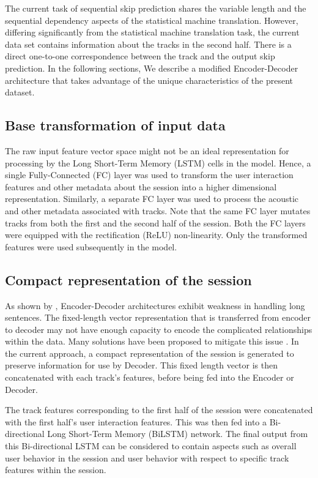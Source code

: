 \documentclass[sigconf]{acmart}
\begin{document}
The current task of sequential skip prediction shares the variable length and the sequential dependency aspects of the statistical machine translation. However, differing significantly from the statistical machine translation task, the current data set contains information about the tracks in the second half. There is a direct one-to-one correspondence between the track and the output skip prediction. In the following sections, We describe a modified Encoder-Decoder architecture that takes advantage of the unique characteristics of the present dataset.

\subsection{Base transformation of input data}
The raw input feature vector space might not be an ideal representation for processing by the Long Short-Term Memory (LSTM) cells in the model. Hence, a single Fully-Connected (FC) layer was used to transform the user interaction features and other metadata about the session into a higher dimensional representation. Similarly, a separate FC layer was used to process the acoustic and other metadata associated with tracks. Note that the same FC layer mutates tracks from both the first and the second half of the session. Both the FC layers were equipped with the rectification (ReLU) non-linearity. Only the transformed features were used subsequently in the model. 

\subsection{Compact representation of the session}
As shown by \citet{cho2014properties}, Encoder-Decoder architectures exhibit weakness in handling long sentences. The fixed-length vector representation that is transferred from encoder to decoder may not have enough capacity to encode the complicated relationships within the data. Many solutions have been proposed to mitigate this issue \cite{luong2015effective} \cite{vaswani2017attention}. In the current approach, a compact representation of the session is generated to preserve information for use by Decoder. This fixed length vector is then concatenated with each track's features, before being fed into the Encoder or Decoder.

The track features corresponding to the first half of the session were concatenated with the first half's user interaction features. This was then fed into a Bi-directional Long Short-Term Memory (BiLSTM) network. The final output from this Bi-directional LSTM can be considered to contain aspects such as overall user behavior in the session and user behavior with respect to specific track features within the session.
\end{document}
